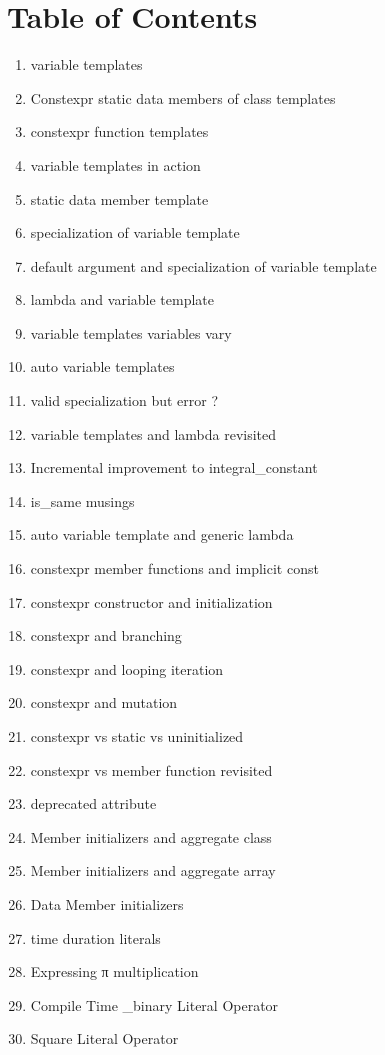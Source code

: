 \section{Table of Contents}
\begin{enumerate}[noitemsep]
\item variable templates
\item Constexpr static data members of class templates
\item constexpr function templates
\item variable templates in action
\item static data member template
\item specialization of variable template
\item default argument and specialization of variable template
\item lambda and variable template
\item variable templates variables vary
\item auto variable templates
\item valid specialization but error ?
\item variable templates and lambda revisited
\item Incremental improvement to integral\_constant
\item is\_same musings
\item auto variable template and generic lambda
\item constexpr member functions and implicit const
\item constexpr constructor and initialization
\item constexpr and branching
\item constexpr and looping iteration
\item constexpr and mutation
\item constexpr vs static vs uninitialized
\item constexpr vs member function revisited
\item deprecated attribute
\item Member initializers and aggregate class
\item Member initializers and aggregate array
\item Data Member initializers
\item time duration literals
\item Expressing π multiplication
\item Compile Time \_binary Literal Operator
\item Square Literal Operator

\end{enumerate}
